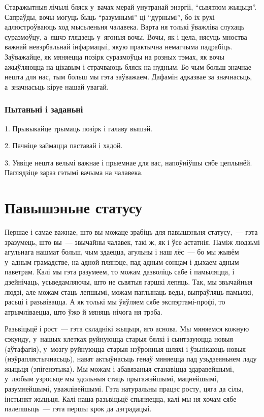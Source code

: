 Старажытныя лічылі бляск у~вачах мерай унутранай энэргіі, ``сьвятлом жыцьця''. Сапраўды, вочы могуць быць ``разумнымі'' ці ``дурнымі'', бо іх рухі адлюстроўваюць ход мысьленьня чалавека. Варта ня толькі ўважліва слухаць суразмоўцу, а~яшчэ глядзець у~ягоныя вочы. Вочы, як і цела, нясуць мноства важнай невэрбальнай інфармацыі, якую практычна немагчыма падрабіць. Заўважайце, як мяняецца позірк суразмоўцы на розных тэмах, як вочы ажыўляюцца на цікавым і страчваюць бляск на нудным. Бо чым больш значнае нешта для нас, тым больш мы гэта заўважаем. Дафамін адказвае за значнасьць, а~значнасьць кіруе нашай увагай.

\subsubsection{Пытаньні і заданьні}

1. Прывыкайце трымаць позірк і галаву вышэй.

2. Пачніце займацца паставай і хадой.

3. Уявіце нешта вельмі важнае і прыемнае для вас, напоўніўшы сябе цеплынёй. Паглядзіце зараз гэтымі вачыма на чалавека.


\section{Павышэньне статусу}

Першае і самае важнае, што вы можаце зрабіць для павышэньня статусу,~--- гэта зразумець, што вы~--- звычайны чалавек, такі ж, як і ўсе астатнія. Паміж людзьмі агульнага нашмат больш, чым здаецца, агульны і наш лёс~--- бо мы жывём у~адным грамадстве, на адной плянэце, пад адным сонцам і дыхаем адным паветрам. Калі мы гэта разумеем, то можам дазволіць сабе і памыляцца, і дзейнічаць, усьведамляючы, што не сьвятыя гаршкі лепяць. Так, мы звычайныя людзі, але можам стаць лепшымі, можам паглынаць веды, выпраўляць памылкі, расьці і разьвівацца. А як толькі мы ўяўляем сябе экспэртамі-профі, то атрымліваецца, што ўжо й мяняць нічога ня трэба.

Разьвіцьцё і рост~--- гэта складнікі жыцьця, яго аснова. Мы мяняемся кожную сэкунду, у~нашых клетках руйнуюцца старыя бялкі і сынтэзуюцца новыя (аўтафагія), у~мозгу руйнуюцца старыя нэўронныя шляхі і ўзьнікаюць новыя (нэўраплястычнасьць), нават актыўнасьць генаў мяняецца пад узьдзеяньнем ладу жыцьця (эпігенэтыка). Мы можам і абавязаныя станавіцца здаравейшымі, у~любым узросьце мы здольныя стаць прыгажэйшымі, мацнейшымі, разумнейшымі, уважлівейшымі. Гэта натуральны працэс росту, цяга да сілы, інстынкт жыцьця. Калі наша разьвіцьцё спыняецца, калі мы ня хочам сябе палепшыць~--- гэта першы крок да дэградацыі.

